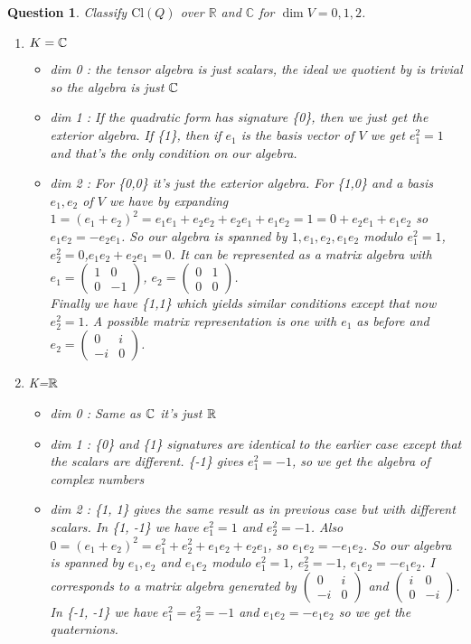 \documentclass[a4paper]{article}
\newtheorem{que}[thm]{Question}
\begin{document}
\begin{que} Classify $ \text{Cl}(Q)$ over $\mathbb{R}$ and $\mathbb{C}$ for $\dim V = 0, 1, 2$.\\
 \begin{enumerate}
     \item $K=\mathbb{C}$
         \begin{itemize}
             \item dim 0 : the tensor algebra is just scalars, the ideal we quotient by is trivial so the algebra is just $\mathbb{C}$
             \item dim 1 : If the quadratic form  has signature \{0\}, then we just get the exterior algebra. If \{1\}, then if $e_1$ is the basis vector of $V$ we get $e_1^2=1$ and that's the only condition on our algebra.
             \item dim 2 : For \{0,0\} it's just the exterior algebra. For \{1,0\} and a basis $e_1,e_2$ of $V$ we have by expanding  $1=\left( e_1+e_2 \right)^2=e_1e_1+e_2e_2+e_2e_1+e_1e_2=1=0+e_2e_1+e_1e_2 $ so $e_1e_2=-e_2e_1$. So our algebra is spanned by $1,e_1,e_2,e_1e_2$ modulo $e_1^2=1$,$e_2^2=0$,$e_1e_2+e_2e_1=0$. It can be represented as a matrix algebra with $e_1=\begin{pmatrix} 1 & 0\\0 & -1 \end{pmatrix} $, $e_2=\begin{pmatrix} 0 & 1\\0 & 0 \end{pmatrix} $.\\
                 Finally we have \{1,1\} which yields similar conditions except that now $e_2^2=1$. A possible matrix representation is one with $e_1$ as before and $e_2=\begin{pmatrix} 0 & i\\-i & 0  \end{pmatrix} $.
         \end{itemize}
     \item K=$\mathbb{R}$
         \begin{itemize}
             \item dim 0 : Same as $\mathbb{C}$ it's just $\mathbb{R}$
             \item dim 1 : \{0\} and \{1\} signatures are identical to the earlier case except that the scalars are different. \{-1\} gives $e_1^2 = -1$, so we get the algebra of complex numbers
             \item dim 2 : \{1, 1\} gives the same result as in previous case but with different scalars. In \{1, -1\} we have $e_1^2 = 1$ and $e_2^2 = -1$. Also $0 = (e_1 + e_2)^2 = e_1^2 + e_2^2 + e_1 e_2 + e_2 e_1$, so $e_1 e_2 = -e_1 e_2$. So our algebra is spanned by $e_1, e_2$ and $e_1e_2$ modulo $e_1^2 = 1$, $e_2^2 = -1$, $e_1 e_2 = -e_1 e_2$. I corresponds to a matrix algebra generated by $\begin{pmatrix} 0 & i\\-i & 0 \end{pmatrix} $ and $\begin{pmatrix} i & 0 \\ 0 & -i \end{pmatrix}$. In \{-1, -1\} we have $e_1^2 = e_2^2 = -1$ and $ e_1 e_2 = - e_1 e_2$ so we get the quaternions.

\end{itemize}
\end{enumerate}
\end{que}
\end{document}
